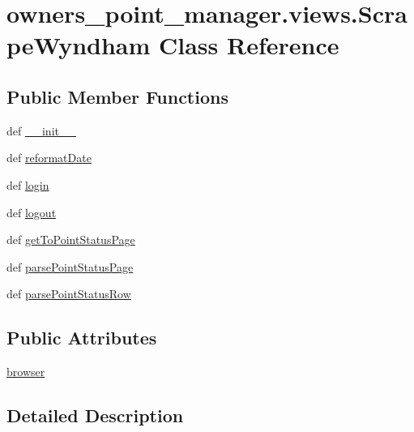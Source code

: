 \hypertarget{classowners__point__manager_1_1views_1_1ScrapeWyndham}{\section{owners\-\_\-point\-\_\-manager.\-views.\-Scrape\-Wyndham Class Reference}
\label{classowners__point__manager_1_1views_1_1ScrapeWyndham}
}
\subsection*{Public Member Functions}
\begin{DoxyCompactItemize}
\item 
def \hyperlink{classowners__point__manager_1_1views_1_1ScrapeWyndham_aa0c86da6710e3017d03a7ba23dd8c81f}{\-\_\-\-\_\-init\-\_\-\-\_\-}
\item 
def \hyperlink{classowners__point__manager_1_1views_1_1ScrapeWyndham_aa0a734a6401d08811119bbb5dfd98327}{reformat\-Date}
\item 
def \hyperlink{classowners__point__manager_1_1views_1_1ScrapeWyndham_af055430ff80b90e6154c930b3989c23e}{login}
\item 
def \hyperlink{classowners__point__manager_1_1views_1_1ScrapeWyndham_a596d1e11f4763935e7766bd28a5c6590}{logout}
\item 
def \hyperlink{classowners__point__manager_1_1views_1_1ScrapeWyndham_a9a039cc197d14a0adb40e58100598587}{get\-To\-Point\-Status\-Page}
\item 
def \hyperlink{classowners__point__manager_1_1views_1_1ScrapeWyndham_aec326b63f6697741e2ea30483046e6cb}{parse\-Point\-Status\-Page}
\item 
def \hyperlink{classowners__point__manager_1_1views_1_1ScrapeWyndham_a710cf6fbee33251a59eeb97afc038cd4}{parse\-Point\-Status\-Row}
\end{DoxyCompactItemize}
\subsection*{Public Attributes}
\begin{DoxyCompactItemize}
\item 
\hyperlink{classowners__point__manager_1_1views_1_1ScrapeWyndham_a8b85e4b79c90e57bf39a394fedcd51ec}{browser}
\end{DoxyCompactItemize}


\subsection{Detailed Description}


